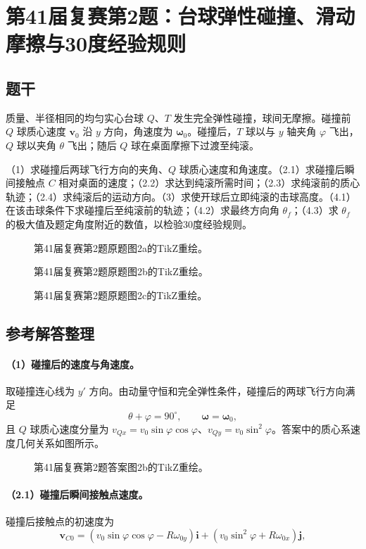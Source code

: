 \section{第41届复赛第2题：台球弹性碰撞、滑动摩擦与30度经验规则}
\subsection{题干}
质量、半径相同的均匀实心台球 $Q$、$T$ 发生完全弹性碰撞，球间无摩擦。碰撞前 $Q$ 球质心速度 $\boldsymbol v_0$ 沿 $y$ 方向，角速度为 $\boldsymbol\omega_0$。碰撞后，$T$ 球以与 $y$ 轴夹角 $\varphi$ 飞出，$Q$ 球以夹角 $\theta$ 飞出；随后 $Q$ 球在桌面摩擦下过渡至纯滚。

（1）求碰撞后两球飞行方向的夹角、$Q$ 球质心速度和角速度。（2.1）求碰撞后瞬间接触点 $C$ 相对桌面的速度；（2.2）求达到纯滚所需时间；（2.3）求纯滚前的质心轨迹；（2.4）求纯滚后的运动方向。（3）求使开球后立即纯滚的击球高度。（4.1）在该击球条件下求碰撞后至纯滚前的轨迹；（4.2）求最终方向角 $\theta_f$；（4.3）求 $\theta_f$ 的极大值及题定角度附近的数值，以检验30度经验规则。
\begin{figure}[htbp]\centering\caption{第41届复赛第2题原题图2a的TikZ重绘。}\end{figure}
\begin{figure}[htbp]\centering\caption{第41届复赛第2题原题图2b的TikZ重绘。}\end{figure}
\begin{figure}[htbp]\centering\caption{第41届复赛第2题原题图2c的TikZ重绘。}\end{figure}
\subsection{参考解答整理}
\paragraph{（1）碰撞后的速度与角速度。}
取碰撞连心线为 $y'$ 方向。由动量守恒和完全弹性条件，碰撞后的两球飞行方向满足
\[\boxed{\theta+\varphi=90^\circ},\qquad \boxed{\boldsymbol\omega=\boldsymbol\omega_0},\]
且 $Q$ 球质心速度分量为 $v_{Qx}=v_0\sin\varphi\cos\varphi$、$v_{Qy}=v_0\sin^2\varphi$。答案中的质心系速度几何关系如图所示。
\begin{figure}[htbp]\centering\caption{第41届复赛第2题答案图2b的TikZ重绘。}\end{figure}
\paragraph{（2.1）碰撞后瞬间接触点速度。}
碰撞后接触点的初速度为
\[\boldsymbol v_{C0}=(v_0\sin\varphi\cos\varphi-R\omega_{0y})\boldsymbol i+(v_0\sin^2\varphi+R\omega_{0x})\boldsymbol j,\]
